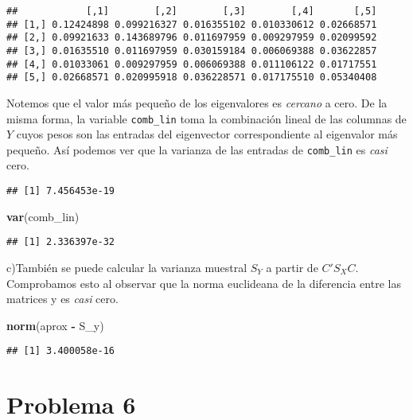 \documentclass[
]{article}
\newenvironment{Shaded}{\begin{snugshade}}{\end{snugshade}}
\newcommand{\KeywordTok}[1]{\textcolor[rgb]{0.13,0.29,0.53}{\textbf{#1}}}
\newcommand{\NormalTok}[1]{#1}
\newcommand{\OperatorTok}[1]{\textcolor[rgb]{0.81,0.36,0.00}{\textbf{#1}}}
\newcommand{\StringTok}[1]{\textcolor[rgb]{0.31,0.60,0.02}{#1}}
\begin{document}
\begin{verbatim}
##            [,1]        [,2]        [,3]        [,4]       [,5]
## [1,] 0.12424898 0.099216327 0.016355102 0.010330612 0.02668571
## [2,] 0.09921633 0.143689796 0.011697959 0.009297959 0.02099592
## [3,] 0.01635510 0.011697959 0.030159184 0.006069388 0.03622857
## [4,] 0.01033061 0.009297959 0.006069388 0.011106122 0.01717551
## [5,] 0.02668571 0.020995918 0.036228571 0.017175510 0.05340408
\end{verbatim}

Notemos que el valor más pequeño de los eigenvalores es \emph{cercano} a
cero. De la misma forma, la variable \texttt{comb\_lin} toma la
combinación lineal de las columnas de \(Y\) cuyos pesos son las entradas
del eigenvector correspondiente al eigenvalor más pequeño. Así podemos
ver que la varianza de las entradas de \texttt{comb\_lin} es \emph{casi}
cero.

\begin{verbatim}
## [1] 7.456453e-19
\end{verbatim}

\begin{Shaded}
\begin{Highlighting}[]
\KeywordTok{var}\NormalTok{(comb_lin)}
\end{Highlighting}
\end{Shaded}

\begin{verbatim}
## [1] 2.336397e-32
\end{verbatim}

c)También se puede calcular la varianza muestral \(S_Y\) a partir de
\(C'S_XC\). Comprobamos esto al observar que la norma euclideana de la
diferencia entre las matrices y es \emph{casi} cero.

\begin{Shaded}
\begin{Highlighting}[]
\KeywordTok{norm}\NormalTok{(aprox }\OperatorTok{-}\StringTok{ }\NormalTok{S_y)}
\end{Highlighting}
\end{Shaded}

\begin{verbatim}
## [1] 3.400058e-16
\end{verbatim}

\hypertarget{problema-6}{%
\section{Problema 6}\label{problema-6}}
\end{document}
